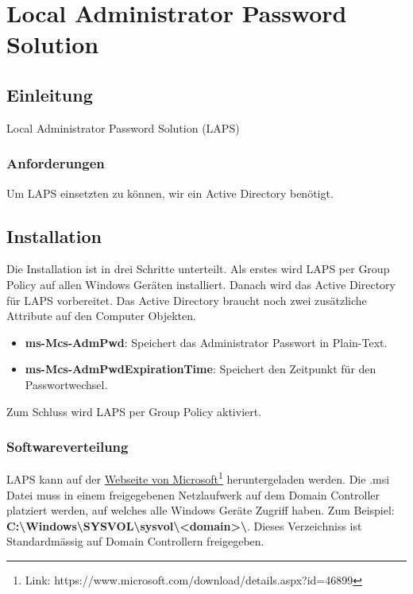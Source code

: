 \chapter{Local Administrator Password Solution}
\section{Einleitung}
Local Administrator Password Solution (LAPS)

\subsection{Anforderungen}
Um LAPS einsetzten zu können, wir ein Active Directory benötigt.



\section{Installation}
Die Installation ist in drei Schritte unterteilt.
Als erstes wird LAPS per Group Policy auf allen Windows Geräten installiert.
Danach wird das Active Directory für LAPS vorbereitet.
Das Active Directory braucht noch zwei zusätzliche Attribute auf den Computer Objekten.
\begin{itemize}
    \item \textbf{ms-Mcs-AdmPwd}: Speichert das Administrator Passwort in Plain-Text.
    \item \textbf{ms-Mcs-AdmPwdExpirationTime}: Speichert den Zeitpunkt für den Passwortwechsel.
\end{itemize}

Zum Schluss wird LAPS per Group Policy aktiviert.


\subsection{Softwareverteilung}
LAPS kann auf der \href{https://www.microsoft.com/download/details.aspx?id=46899}{Webseite von Microsoft}\footnote{Link: https://www.microsoft.com/download/details.aspx?id=46899} heruntergeladen werden.
Die .msi Datei muss in einem freigegebenen Netzlaufwerk auf dem Domain Controller platziert werden, auf welches alle Windows Geräte Zugriff haben.
Zum Beispiel: \textbf{C:\textbackslash Windows\textbackslash SYSVOL\textbackslash sysvol\textbackslash <domain>\textbackslash}.
Dieses Verzeichniss ist Standardmässig auf Domain Controllern freigegeben.\\

